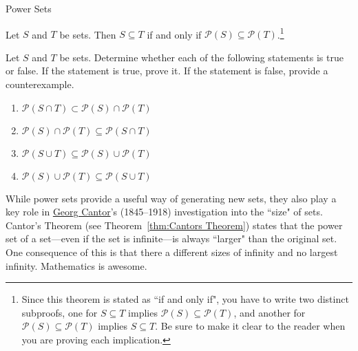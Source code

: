 \begin{section}{Power Sets}
\begin{theorem}
Let $S$ and $T$ be sets.  Then $S\subseteq T$ if and only if $\mathcal{P}(S)\subseteq \mathcal{P}(T)$.\footnote{Since this theorem is stated as ``if and only if", you have to write two distinct subproofs, one for $S\subseteq T$ implies $\mathcal{P}(S)\subseteq \mathcal{P}(T)$, and another for $\mathcal{P}(S)\subseteq \mathcal{P}(T)$ implies $S\subseteq T$. Be sure to make it clear to the reader when you are proving each implication.}
\end{theorem}

\begin{problem}
Let $S$ and $T$ be sets. Determine whether each of the following statements is true or false. If the statement is true, prove it. If the statement is false, provide a counterexample.
\begin{enumerate}[label=\textrm{(\alph*)}]
\item $\mathcal{P}(S\cap T) \subset \mathcal{P}(S)\cap\mathcal{P}(T)$
\item $\mathcal{P}(S)\cap\mathcal{P}(T)\subseteq \mathcal{P}(S\cap T)$
\item $\mathcal{P}(S\cup T)\subseteq \mathcal{P}(S)\cup\mathcal{P}(T)$
\item $\mathcal{P}(S)\cup\mathcal{P}(T)\subseteq \mathcal{P}(S\cup T)$
\end{enumerate}
\end{problem}

While power sets provide a useful way of generating new sets, they also play a key role in \href{https://en.wikipedia.org/wiki/Georg_Cantor}{Georg Cantor}'s (1845--1918) investigation into the ``size" of sets. Cantor's Theorem (see Theorem~\ref{thm:Cantors Theorem}) states that the power set of a set---even if the set is infinite---is always ``larger" than the original set. One consequence of this is that there a different sizes of infinity and no largest infinity. Mathematics is awesome.

\end{section}